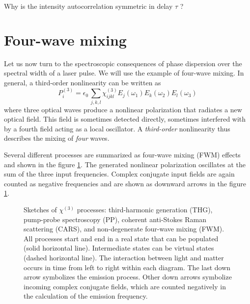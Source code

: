 \begin{questions}
\item Why is the intensity autocorrelation symmetric in delay $\tau$ ?
\end{questions}



		
\section{Four-wave mixing}

Let us now turn to the spectroscopic consequences of phase dispersion over the spectral width of a laser pulse. We will use the example of four-wave mixing. In general, a third-order nonlinearity can be written as
\begin{equation}
  P^{(3)}_i = \epsilon_0 \, 
    \sum_{j,k,l} \chi^{(3)}_{ijkl} E_j(\omega_1) E_k(\omega_2) E_l(\omega_3)  
\end{equation}		
where three optical waves produce a nonlinear polarization that radiates a new optical field. This field is sometimes detected directly, sometimes interfered with by a fourth field acting as a local oscillator. A \emph{third-order} nonlinearity thus describes the mixing of \emph{four} waves.
		
		
Several different processes are summarized as four-wave mixing (FWM) effects and shown in the figure \ref{fig:fwm_processes}.  The generated nonlinear polarization oscillates at the sum of the three input frequencies. Complex conjugate input fields are again counted as negative frequencies and are shown as downward arrows in the figure \ref{fig:fwm_processes}.
	
	
\begin{figure}

\caption{Sketches of  $\chi^{(3)}$ processes:
%
third-harmonic generation (THG), pump-probe spectroscopy (PP), coherent anti-Stokes Raman scattering (CARS), and  non-degenerate four-wave mixing (FWM).
%
All processes start and end in a real state that can be populated (solid horizontal line). Intermediate states can be virtual states (dashed horizontal line). The interaction between light and matter occurs in time from left to right within each diagram. The last down arrow symbolizes the emission process. Other down arrows symbolize incoming complex conjugate fields, which are counted negatively in the calculation of the emission frequency.
\label{fig:fwm_processes}}
\end{figure}

